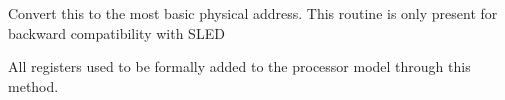
\begin{DoxyRefList}
\item[Member \mbox{\hyperlink{classAddress_a5dfb849ac01e7b1ca87d0ecbf5022dca}{Address::to\+Physical}} (void)]\label{deprecated__deprecated000001}%
%
Convert this to the most basic physical address. This routine is only present for backward compatibility with S\+L\+ED  
\item[Member \mbox{\hyperlink{classTranslate_a2614aefa5c03a9f1ed0b2dba794cad2c}{Translate::add\+Register}} (const string \&nm, \mbox{\hyperlink{classAddrSpace}{Addr\+Space}} $\ast$base, uintb offset, int4 size)=0]\label{deprecated__deprecated000002}%
%
All registers used to be formally added to the processor model through this method. 
\end{DoxyRefList}
